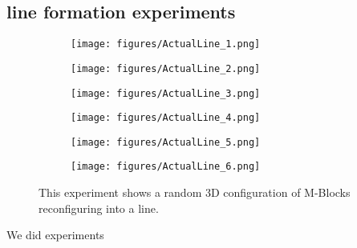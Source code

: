 \subsection{line formation experiments}
\label{sec:mblocksExperimentsLine}

\begin{figure}[h]  
	\centering
	\begin{subfigure}[b]{0.32\linewidth}
		\texttt{[image: figures/ActualLine\_1.png]}
		\subcaption{} 
	\end{subfigure}
	\begin{subfigure}[b]{0.32\linewidth}
		\texttt{[image: figures/ActualLine\_2.png]}
		\subcaption{} 
	\end{subfigure}
	\begin{subfigure}[b]{0.32\linewidth}
		\texttt{[image: figures/ActualLine\_3.png]}
		\subcaption{} 
	\end{subfigure}

	\begin{subfigure}[b]{0.32\linewidth}
		\texttt{[image: figures/ActualLine\_4.png]}
		\subcaption{} 
	\end{subfigure}
	\begin{subfigure}[b]{0.32\linewidth}
		\texttt{[image: figures/ActualLine\_5.png]}
		\subcaption{} 
	\end{subfigure}
	\begin{subfigure}[b]{0.32\linewidth}
		\texttt{[image: figures/ActualLine\_6.png]}
		\subcaption{} 
	\end{subfigure}
	
	\caption{This experiment shows a random 3D configuration of M-Blocks reconfiguring into a line.}
	
	\label{fig:lineExperiment}
\end{figure}

We did experiments

